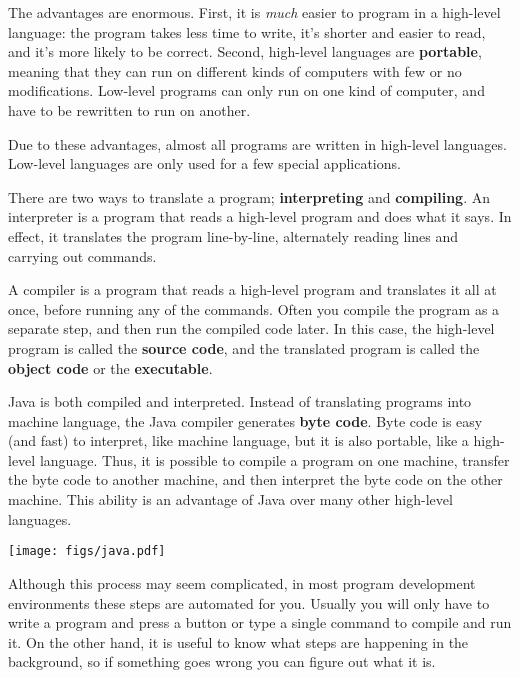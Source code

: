 \documentclass[12pt]{book}
\theoremstyle{definition}
\begin{document}

The advantages are enormous.  First,
it is {\em much} easier to program in a high-level language:
the program takes less time to write,
it's shorter and easier to read, and it's more likely to be
correct.  Second, high-level languages are {\bf portable},
meaning that they can run on different kinds of computers with
few or no modifications.  Low-level programs can only run
on one kind of computer, and have to be rewritten to run on
another.

Due to these advantages, almost all programs are written in
high-level languages.  Low-level languages are only used for
a few special applications.


There are two ways to translate a program;
{\bf interpreting} and {\bf compiling}.  An interpreter
is a program that reads a high-level program
and does what it says.  In effect, it translates
the program line-by-line, alternately reading lines and
carrying out commands.

A compiler is a program that reads a high-level program and
translates it all at once, before running any of the commands.
Often you compile the program as a separate step, and then
run the compiled code later.  In this case, the high-level
program is called the {\bf source code}, and the translated
program is called the {\bf object code} or the {\bf executable}.

Java is both compiled and
interpreted.  Instead of translating programs into
machine language, the Java compiler generates {\bf byte code}.
Byte code is easy (and fast) to interpret, like machine language,
but it is also portable, like a high-level language.  Thus,
it is possible to compile a program on one machine,
transfer the byte code to another machine,
and then interpret the byte code on the other machine.  This
ability is an advantage of Java over many other
high-level languages.


\texttt{[image: figs/java.pdf]}


Although this process may seem complicated, in most program
development environments these steps
are automated for you.  Usually you will only have to write a program
and press a button or type a single command to compile and run it.  On
the other hand, it is useful to know what steps are
happening in the background, so if something goes wrong you can
figure out what it is.
\end{document}
